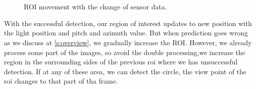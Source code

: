 \begin{figure}[!ht]
\centering
{}\\
\\

\caption{ROI movement with the change of sensor data.}
\label{f:rec_mv}
\end{figure}


With the successful detection, our region of interest updates to new position with the light position and pitch and azimuth value.
But when prediction goes wrong as we discuss at \ref{s:overview}, we gradually increase the ROI.
However, we already process some part of the images, so avoid the double processing,we increase the region in the surrounding sides of the previous roi where we has unsuccessful detection.
If at any of these area, we can detect the circle, the view point of the roi changes to that part of tha frame.

